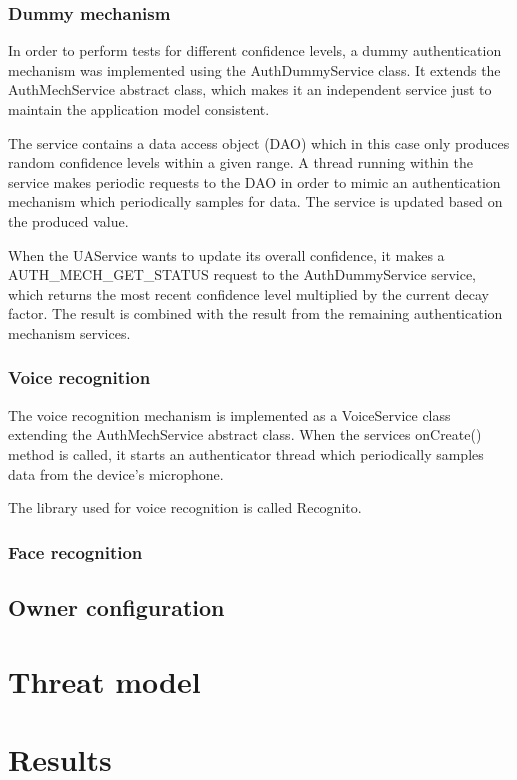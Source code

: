 \subsubsection{Dummy mechanism}
In order to perform tests for different confidence levels, a dummy authentication mechanism was implemented using the AuthDummyService class. It extends the AuthMechService abstract class, which makes it an independent service just to maintain the application model consistent. 

The service contains a data access object (DAO) which in this case only produces random confidence levels within a given range. A thread running within the service makes periodic requests to the DAO in order to mimic an authentication mechanism which periodically samples for data. The service is updated based on the produced value. 

When the UAService wants to update its overall confidence, it makes a AUTH\_MECH\_GET\_STATUS request to the AuthDummyService service, which returns the most recent confidence level multiplied by the current decay factor. The result is combined with the result from the remaining authentication mechanism services.

\subsubsection{Voice recognition}
The voice recognition mechanism is implemented as a VoiceService class extending the AuthMechService abstract class. When the services onCreate() method is called, it starts an authenticator thread which periodically samples data from the device's microphone.

The library used for voice recognition is called Recognito.

\subsubsection{Face recognition}

\subsection{Owner configuration}

\section{Threat model}


\section{Results}
